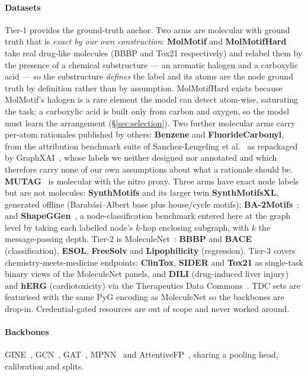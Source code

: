 \paragraph{Datasets} Tier-1 provides the ground-truth anchor. Two arms are
molecular with ground truth that is \emph{exact by our own construction}:
\textbf{MolMotif} and \textbf{MolMotifHard} take real drug-like molecules
(BBBP and Tox21 respectively) and relabel them by the presence of a chemical
substructure --- an aromatic halogen and a carboxylic acid --- so the
substructure \emph{defines} the label and its atoms are the node ground truth
by definition rather than by assumption. MolMotifHard exists because MolMotif's
halogen is a rare element the model can detect atom-wise, saturating the task;
a carboxylic acid is built only from carbon and oxygen, so the model must learn
the arrangement (\S\ref{sec:selection}). Two further molecular arms carry
per-atom rationales published by others: \textbf{Benzene} and
\textbf{FluorideCarbonyl}, from the attribution benchmark suite of
Sanchez-Lengeling et al.~\cite{sanchez2020} as repackaged by
GraphXAI~\cite{graphxai}, whose labels we neither designed nor annotated and
which therefore carry none of our own assumptions about what a rationale should
be. \textbf{MUTAG}~\cite{mutag,tudataset} is molecular with the nitro proxy.
Three arms have exact node labels but are not molecules: \textbf{SynthMotifs}
and its larger twin
\textbf{SynthMotifsXL}, generated offline (Barab\'asi--Albert base plus
house/cycle motifs); \textbf{BA-2Motifs}~\cite{pgexplainer}; and
\textbf{ShapeGGen}~\cite{graphxai}, a node-classification benchmark entered
here at the graph level by taking each labelled node's $k$-hop enclosing
subgraph, with $k$ the message-passing depth. Tier-2 is
MoleculeNet~\cite{moleculenet}: \textbf{BBBP} and \textbf{BACE}
(classification), \textbf{ESOL}, \textbf{FreeSolv} and \textbf{Lipophilicity}
(regression). Tier-3 covers chemistry-meets-medicine endpoints:
\textbf{ClinTox}, \textbf{SIDER} and \textbf{Tox21} as single-task binary views
of the MoleculeNet panels, and \textbf{DILI} (drug-induced liver injury) and
\textbf{hERG} (cardiotoxicity) via the Therapeutics Data Commons~\cite{tdc}.
TDC sets are featurised with the same PyG encoding as MoleculeNet so the
backbones are drop-in. Credential-gated resources are out of scope and never
worked around.

\paragraph{Backbones} GINE~\cite{gin,pretraingnn}, GCN~\cite{gcn},
GAT~\cite{gat}, MPNN~\cite{mpnn} and AttentiveFP~\cite{attentivefp}, sharing a
pooling head, calibration and splits.

